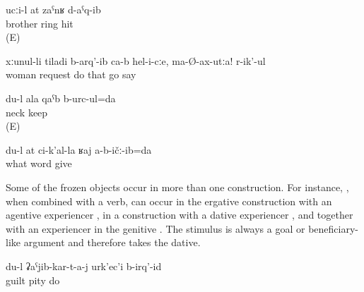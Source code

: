 \begin{exe}
	\ex	\label{ex:Bivalent verbs with frozen objectsValency}
	\begin{xlist}
		\ex	{} 
		\ex	{}  	
		\ex	{} 
		\ex	{} 
		\ex	{} 
		\ex	{} 
		\ex	{} 
		\ex	{} 
		\ex	{} 
	\end{xlist}

	\ex	\label{ex:Brother called you}
	\gll	ucːi-l	at	zaˁnʁ	d-aˁq-ib\\
		brother		ring	hit\\
	\glt	{} (E)

	\ex	\label{ex:His wife begged him, Don't go}
	\gll	xːunul-li	tiladi	b-arq'-ib ca-b	hel-i-cːe,	ma-Ø-ax-utːa!	r-ik'-ul\\
		woman	request	do 	that	go	say\\
	\glt	{}

	\ex	\label{ex:I am hugging you}
	\gll	du-l	ala	qaˁb	b-urc-ul=da\\
				neck	keep\\
	\glt	{} (E)

	\ex	\label{ex:I did not promise you everything}
	\gll	du-l at	ci-k'al-la	ʁaj	a-b-ičː-ib=da\\
				what	word	give\\
	\glt	{}
\end{exe}

Some of the frozen objects occur in more than one construction. For instance, , when combined with a verb, can occur in the ergative construction with an agentive experiencer , in a construction with a dative experiencer , and together with an experiencer in the genitive . The stimulus is always a goal or beneficiary-like argument and therefore takes the dative. 
%
\begin{exe}
	\ex	\label{ex:I pity the convicted}
	\gll	du-l	ʡaˁjib-kar-t-a-j	urk'ec'i	b-irq'-id\\
			guilt	pity	do\\
	\glt	{}

\end{exe}

